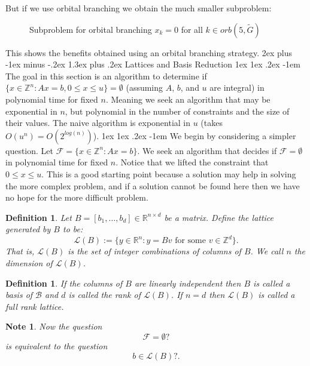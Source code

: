 \documentclass[11pt]{article}
\makeatletter
\renewcommand{\section}{\@startsection{section}{1}{0mm}%
                                   {2ex plus -1ex minus -.2ex}%
                                   {1.3ex plus .2ex}%
                                   {\normalfont\Large\bfseries}}%
\renewcommand\paragraph{\@startsection{paragraph}{4}{0mm}%
                                    {1ex \@plus1ex \@minus.2ex}%
                                    {-1em}%
                                    {\normalfont\normalsize\bfseries}}
\newtheorem{definition}[fact]{Definition}
\newtheorem{note}[fact]{Note}
\newcommand{\R}{\ensuremath{\mathbb R}}
\newcommand{\Z}{\ensuremath{\mathbb Z}}
\makeatother
\begin{document}
But if we use orbital branching we obtain the much smaller subproblem:
\begin{figure}[H]
\centering
{}
\caption{Subproblem for orbital branching $x_k = 0$ for all $k \in orb(5,\tilde{G})$}
\end{figure}
This shows the benefits obtained using an orbital branching strategy.
\section{Lattices and Basis Reduction}
\paragraph{}
The goal in this section is an algorithm to determine if $\{x \in \Z^n: Ax=b, 0 \leq x \leq u \} = \emptyset$ (assuming $A$, $b$, and $u$ are integral) in polynomial time for fixed $n$. Meaning we seek an algorithm that may be exponential in $n$, but polynomial in the number of constraints and the size of their values. The naive algorithm is exponential in $u$ (takes $O(u^n) = O(2^{log(n)})$).
\paragraph{}
We begin by considering a simpler question. Let $\mathcal{F} = \{x \in \Z^n: Ax=b \}$. We seek an algorithm that decides if $\mathcal{F} = \emptyset$ in polynomial time for fixed $n$. Notice that we lifted the constraint that $0 \leq x \leq u$. This is a good starting point because a solution may help in solving the more complex problem, and if a solution cannot be found here then we have no hope for the more difficult problem.
\begin{definition}
Let $B = [b_1,\dots,b_d] \in \R^{n \times d}$ be a matrix. Define the lattice generated by $B$ to be:
$$\mathcal{L}(B) := \{y \in \R^n : y = Bv \text{ for some } v \in \Z^d \}.$$
That is, $\mathcal{L}(B)$ is the set of integer combinations of columns of $B$. We call $n$ the dimension of $\mathcal{L}(B)$.
\end{definition}
\begin{definition}
If the columns of $B$ are linearly independent then $B$ is called a basis of $\mathcal{B}$ and $d$ is called the rank of $\mathcal{L}(B)$. If $n=d$ then $\mathcal{L}(B)$ is called a full rank lattice.
\end{definition}
\begin{note}
Now the question $$\mathcal{F} = \emptyset?$$ is equivalent to the question $$b \in \mathcal{L}(B)?.$$ 
\end{note}
\end{document}

